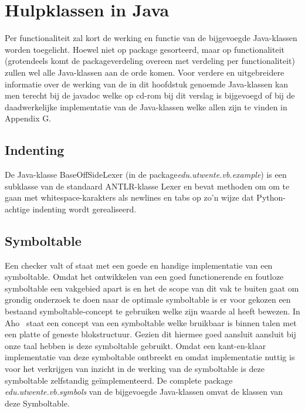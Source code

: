 \chapter{Hulpklassen in Java}
Per functionaliteit zal kort de werking en functie van de bijgevoegde Java-klassen worden toegelicht. Hoewel niet op package gesorteerd, maar op functionaliteit (grotendeels komt de packageverdeling overeen met verdeling per functionaliteit) zullen wel alle Java-klassen aan de orde komen. Voor verdere en uitgebreidere informatie over de werking van de in dit hoofdstuk genoemde Java-klassen kan men terecht bij de javadoc welke op cd-rom bij dit verslag is bijgevoegd of bij de daadwerkelijke implementatie van de Java-klassen welke allen zijn te vinden in Appendix G.

\section{Indenting}
De Java-klasse BaseOffSideLexer (in de package\emph{edu.utwente.vb.example}) is een subklasse van de standaard ANTLR-klasse Lexer en bevat methoden om om te gaan met whitespace-karakters als newlines en tabs op zo'n wijze dat Python-achtige indenting wordt gerealiseerd.

\section{Symboltable}
Een checker valt of staat met een goede en handige implementatie van een symboltable. Omdat het ontwikkelen van een goed functionerende en foutloze symboltable een vakgebied apart is en het de scope van dit vak te buiten gaat om grondig onderzoek te doen naar de optimale symboltable is er voor gekozen een bestaand symboltable-concept te gebruiken welke zijn waarde al heeft bewezen. In Aho~\cite[p.85-90]{aho2007compilers} staat een concept van een symboltable welke bruikbaar is binnen talen met een platte of geneste blokstructuur. Gezien dit hiermee goed aansluit aansluit bij onze taal hebben is deze symboltable gebruikt. Omdat een kant-en-klaar implementatie van deze symboltable ontbreekt en omdat implementatie nuttig is voor het verkrijgen van inzicht in de werking van de symboltable is deze symboltable zelfstandig ge\"{i}mplementeerd. De complete package \emph{edu.utwente.vb.symbols} van de bijgevoegde Java-klassen omvat de klassen van deze Symboltable.

